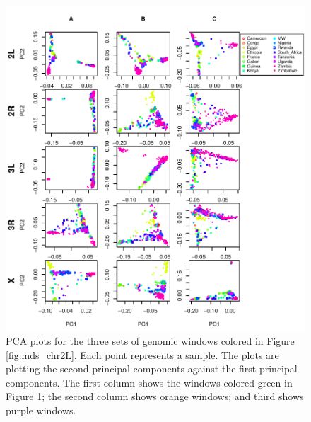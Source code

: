 \documentclass[11pt, oneside]{article}   	%
\begin{document}
\begin{figure}
    \begin{center}
       \includegraphics[width=1\textwidth]{Fig2_pca_plots_allchr_3peaks_label_update}
    \end{center}
    \caption{      
        PCA plots for the three sets of genomic windows colored in Figure \ref{fig:mds_chr2L}. 
        Each point represents a sample. 
        The plots are plotting the second principal components against the first principal components. 
        The first column shows the windows colored green in Figure 1; the second column shows orange windows; and third shows purple windows.
         \label{fig:pca_chr2L}
    }
\end{figure}
\end{document}
